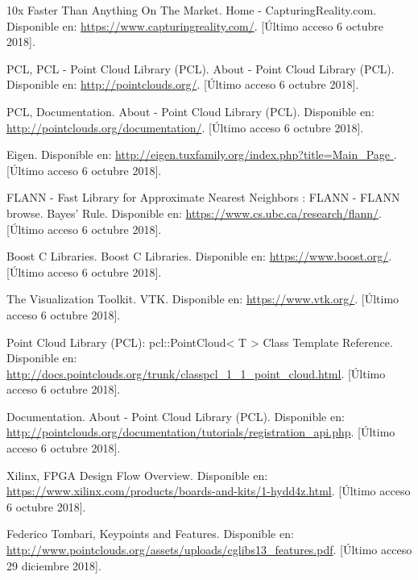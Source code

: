 \begin{thebibliography}{99}


 10x Faster Than Anything On The Market. Home - CapturingReality.com. Disponible en: \url{https://www.capturingreality.com/}. [Último acceso 6 octubre 2018].


 PCL, PCL - Point Cloud Library (PCL). About - Point Cloud Library (PCL). Disponible en: \url{http://pointclouds.org/}. [Último acceso 6 octubre 2018].


 PCL, Documentation. About - Point Cloud Library (PCL). Disponible en: \url{http://pointclouds.org/documentation/}. [Último acceso 6 octubre 2018].



 Eigen. Disponible en: \url{ http://eigen.tuxfamily.org/index.php?title=Main_Page }. [Último acceso 6 octubre 2018].

 FLANN - Fast Library for Approximate Nearest Neighbors : FLANN - FLANN browse. Bayes' Rule. Disponible en: \url{https://www.cs.ubc.ca/research/flann/}. [Último acceso 6 octubre 2018].

 Boost C Libraries. Boost C Libraries. Disponible en: \url{ https://www.boost.org/}. [Último acceso 6 octubre 2018].


 The Visualization Toolkit. VTK. Disponible en: \url{https://www.vtk.org/}. [Último acceso 6 octubre 2018].

 Point Cloud Library (PCL): pcl::PointCloud< T > Class Template Reference. Disponible en: \url{http://docs.pointclouds.org/trunk/classpcl_1_1_point_cloud.html}. [Último acceso 6 octubre 2018].


 Documentation. About - Point Cloud Library (PCL). Disponible en: \url{http://pointclouds.org/documentation/tutorials/registration_api.php}. [Último acceso 6 octubre 2018].


Xilinx, FPGA Design Flow Overview. Disponible en: \url{https://www.xilinx.com/products/boards-and-kits/1-hydd4z.html}. [Último acceso 6 octubre 2018].


 Federico Tombari, Keypoints and Features. Disponible en: \url{http://www.pointclouds.org/assets/uploads/cglibs13_features.pdf}. [Último acceso 29 diciembre 2018].




\end{thebibliography}
